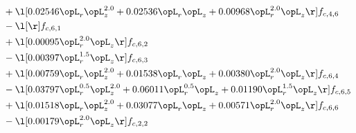 \begin{alignat}{2}
& + \l[  0.02546 \opL_r \opL_z^{2.0} +  0.02536 \opL_r \opL_z +  0.00968 \opL_r^{2.0} \opL_z  \r] f_{c,4,6} \nonumber \\ 
& - \l[  \r] f_{c,6,1} \nonumber \\ 
& + \l[  0.00095 \opL_r^{2.0} \opL_z  \r] f_{c,6,2} \nonumber \\ 
& - \l[  0.00397 \opL_r^{1.5} \opL_z  \r] f_{c,6,3} \nonumber \\ 
& + \l[  0.00759 \opL_r \opL_z^{2.0} +  0.01538 \opL_r \opL_z +  0.00380 \opL_r^{2.0} \opL_z  \r] f_{c,6,4} \nonumber \\ 
& - \l[  0.03797 \opL_r^{0.5} \opL_z^{2.0} +  0.06011 \opL_r^{0.5} \opL_z +  0.01190 \opL_r^{1.5} \opL_z  \r] f_{c,6,5} \nonumber \\ 
& + \l[  0.01518 \opL_r \opL_z^{2.0} +  0.03077 \opL_r \opL_z +  0.00571 \opL_r^{2.0} \opL_z  \r] f_{c,6,6} \nonumber \\ 
& - \l[  0.00179 \opL_r^{2.0} \opL_z  \r] f_{c,2,2} \nonumber \\ 
\end{alignat} 


